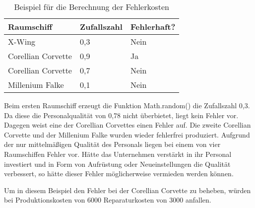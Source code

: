 \medskip

\begin{table}[ht]
     \centering
     \begin{tabular}{ | l | l | l | }
          \hline
          Raumschiff & Zufallszahl & Fehlerhaft? \\
          \hline \hline
          X-Wing & 0,3 & Nein \\ \hline
          Corellian Corvette & 0,9 & Ja \\ \hline
          Corellian Corvette & 0,7 & Nein \\ \hline
          Millenium Falke & 0,1 & Nein \\ \hline
     \end{tabular}
     \caption{Beispiel für die Berechnung der Fehlerkosten}
     \label{tab:spielwelt-logik-fehlerkosten-beispiel}
\end{table}

Beim ersten Raumschiff erzeugt die Funktion Math.random() die Zufallszahl 0,3. Da diese die Personalqualität
von 0,78 nicht überbietet, liegt kein Fehler vor. Dagegen weist eine der Corellian Corvettes einen Fehler auf.
Die zweite Corellian Corvette und der Millenium Falke wurden wieder fehlerfrei produziert.
Aufgrund der nur mittelmäßigen Qualität des Personals liegen bei einem von vier Raumschiffen Fehler vor. Hätte das
Unternehmen verstärkt in ihr Personal investiert und in Form von Aufrüstung oder Neueinstellungen die Qualität verbessert,
so hätte dieser Fehler möglicherweise vermieden werden können.

Um in diesem Beispiel den Fehler bei der Corellian Corvette zu beheben, würden bei Produktionskosten von 6000\curr{}
Reparaturkosten von 3000\curr{} anfallen.